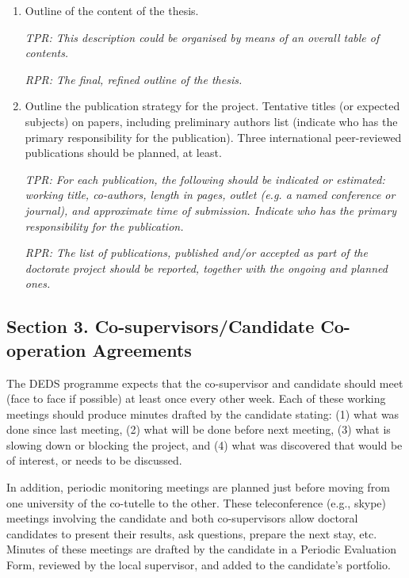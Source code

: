 \documentclass[12pt]{article}
\begin{document}
\begin{enumerate}
\item Outline of the content of the thesis.

\begin{shaded}
\emph{TPR: This description could be organised by means of an overall table of contents.}

\emph{RPR: The final, refined outline of the thesis.}
\end{shaded}

\item
Outline the publication strategy for the project.
Tentative titles (or expected subjects) on papers, including preliminary authors list (indicate who has the primary responsibility for the publication). Three international peer-reviewed publications should be planned, at least.

\begin{shaded}
\emph{TPR:
For each publication, the following should be indicated or estimated: working title, co-authors, length in pages, outlet (e.g. a named conference or journal), and approximate time of submission. Indicate who has the primary responsibility for the publication. 
}

\emph{RPR: The list of publications, published and/or accepted as part of the doctorate project should be reported, together with the ongoing and planned ones.}
\end{shaded}

\end{enumerate}

\subsection*{Section 3. Co-supervisors/Candidate Co-operation Agreements}

The DEDS programme expects that the co-supervisor and candidate should meet (face to face if possible) at least once every other week.
Each of these working meetings should produce minutes drafted by the candidate stating:
(1) what was done since last meeting,
(2) what will be done before next meeting,
(3) what is slowing down or blocking the project, and
(4) what was discovered that would be of interest, or needs to be discussed.

In addition, periodic monitoring meetings are planned just before moving from one university of the co-tutelle to the other.
These teleconference (e.g., skype) meetings involving the candidate and both co-supervisors allow doctoral candidates to present their results, ask questions, prepare the next stay, etc.
Minutes of these meetings are drafted by the candidate in a Periodic Evaluation Form, reviewed by the local supervisor, and added to the candidate's portfolio.%
\end{document}

